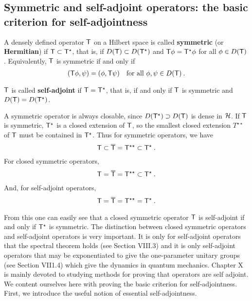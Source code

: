\subsection{Symmetric and self-adjoint operators:
the basic criterion for self-adjointness}

\begin{definition}
A densely defined operator $\mathsf{T}$ on a Hilbert space is called \textbf{symmetric} (or \textbf{Hermitian}) if $\mathsf{T} \subset \mathsf{T}^\star$, that is, if $D(\mathsf{T}) \subset D(\mathsf{T}^\star)$ and $\mathsf{T} \phi = \mathsf{T}^\star \phi$ for all $\phi \in D(\mathsf{T})$. Equivalently, $\mathsf{T}$ is symmetric if and only if
\begin{align}
    (\mathsf{T} \phi, \psi) = (\phi, \mathsf{T} \psi) \quad \text{for all } \phi, \psi \in D (\mathsf{T}) \:.
\end{align}

\end{definition}

\begin{definition}
    $\mathsf{T}$ is called \textbf{self-adjoint} if $\mathsf{T} = \mathsf{T}^\star$, that is, if and only if  $\mathsf{T}$ is symmetric and $D(\mathsf{T}) = D(\mathsf{T}^\star)$.
\end{definition}

A symmetric operator is always closable, since $D(\mathsf{T}^\star) \supset D(\mathsf{T})$ is dense in $\mathcal{H}$. If $\mathsf{T}$ is symmetric, $\mathsf{T}^\star$ is a closed extension of $\mathsf{T}$, so the smallest closed extension $T^{\star \star}$ of $\mathsf{T}$ must be contained in $\mathsf{T}^\star$. Thus for symmetric operators, we have
\begin{align}
    \mathsf{T} \subset \mathsf{\overline{T}} = \mathsf{T}^{\star \star}  \subset \mathsf{T}^\star \:.
\end{align}
For closed symmetric operators, \begin{align}
    \mathsf{T} = \mathsf{\overline{T}} = \mathsf{T}^{\star \star} \subset \mathsf{T}^\star \:.
\end{align}
And, for self-adjoint operators,
\begin{align}
    \mathsf{T}= \mathsf{\overline{T}} = \mathsf{T}^{\star \star}  = \mathsf{T}^{\star } \:. 
\end{align}

From this one can easily see that a closed symmetric operator $\mathsf{T}$ is self-adjoint if and only if $\mathsf{T}^\star$ is symmetric.
The distinction between closed symmetric operators and self-adjoint operators is very important. It is only for self-adjoint operators that the spectral theorem holds (see Section VIII.3) and it is only self-adjoint operators that may be exponentiated to give the one-parameter unitary groups (see Section VII1.4) which give the dynamics in quantum mechanics. Chapter X is mainly devoted to studying methods for proving that operators are self adjoint. We content ourselves here with proving the basic criterion for self-adjointness. First, we introduce the useful notion of essential self-adjointness.

